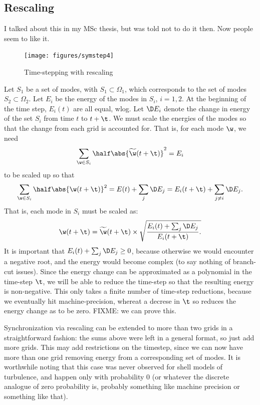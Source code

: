 \documentclass[10pt,showpacs,showkeys,%
amsfonts,amsmath,onecolumn,
floatfix,aps,superscriptaddress]{revtex4}
\begin{document}
\subsection{Rescaling}
I talked about this in my MSc thesis, but was told not to do it then.  Now 
people seem to like it.
\begin{figure}[htbp]
  \begin{center}
    \texttt{[image: figures/symstep4]}
    \caption{Time-stepping with rescaling}
    \label{symstep4}
  \end{center}
\end{figure}
Let $S_1$ be a set of modes, with $S_1\subset\Omega_1$, which corresponds
to the set of modes $S_2\subset\Omega_2$. Let $E_i$ be the energy of the
modes in $S_i$, $i=1,2$. At the beginning of the time step, $E_i(t)$ are
all equal, wlog. Let $\D E_i$ denote the change in energy of the set
$S_i$ from time $t$ to $t+\t$. We must scale the energies of the modes
so that the change from each grid is accounted for. That is, for
each mode $\w$, we need
\begin{eqnarray}
  \sum_{\w\in S_i}\half\abs{\widetilde\w(t+\t)}^2 = E_i 
\end{eqnarray}
to be scaled up so that
\begin{eqnarray}
  \sum_{\w\in S_i}\half\abs{\w(t+\t)}^2 
  = E(t) + \sum_j \D E_j
  = E_i(t+\t) + \sum_{j\neq i} \D E_j.
\end{eqnarray}
That is, each mode in $S_i$ must be scaled as:
\begin{eqnarray}
  \w(t+\t)=\widetilde\w(t+\t) \times
  \sqrt{
    \frac{E_i(t) + \sum_{j} \D E_j}{E_i(t+\t)}.
  }
\end{eqnarray}
It is important that $E_i(t) + \sum_{j} \D E_j\geq 0$, because otherwise
we would encounter a negative root, and the energy would become complex
(to say nothing of branch-cut issues).  Since the energy change can
be approximated as a polynomial in the time-step $\t$, we will be able
to reduce the time-step so that the resulting energy is non-negative. This
only takes a finite number of time-step reductions, because we eventually
hit machine-precision, whereat a decrese in $\t$ so reduces the energy
change as to be zero. FIXME: we can prove this.

Synchronization via rescaling can be extended to more than two grids in
a straightforward fashion: the sums above were left in a general format,
so just add more grids. This may add restrictions on the timestep, since
we can now have more than one grid removing energy from a corresponding 
set of modes. It is worthwhile noting that this case was never observed 
for shell models of turbulence, and happen only with probability 0 (or
whatever the discrete analogue of zero probability is, probably something
like machine precision or something like that).
\end{document}
